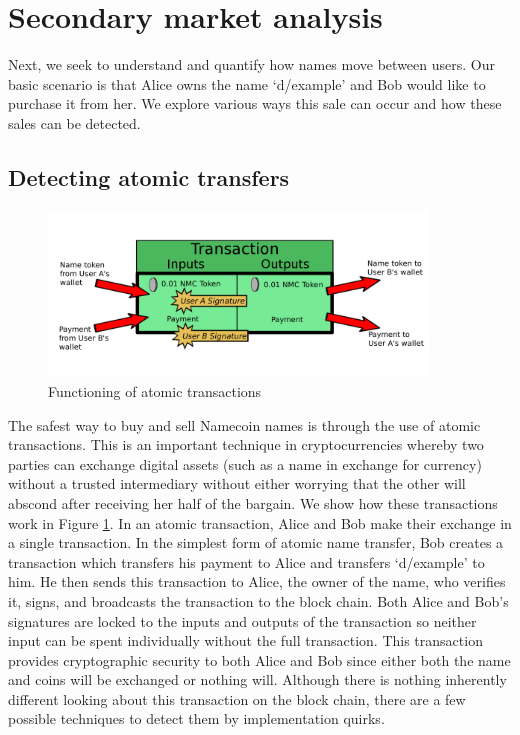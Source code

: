 \section{Secondary market analysis}
\label{sec:methods}
Next, we seek to understand and quantify how names move between users. Our basic scenario is that Alice owns the name `d/example' and Bob would like to purchase it from her. We explore various ways this sale can occur and how these sales can be detected.

\subsection{Detecting atomic transfers}

\begin{figure}
  \centering
  \includegraphics[width=0.9\textwidth]{figures/atomicTX}
  \caption{Functioning of atomic transactions}
  \label{fig:atomic}
\end{figure}

The safest way to buy and sell Namecoin names is through the use of atomic transactions. This is an important technique in cryptocurrencies whereby two parties can exchange digital assets (such as a name in exchange for currency) without a trusted intermediary without either worrying that the other will abscond after receiving her half of the bargain. We show how these transactions work in Figure \ref{fig:atomic}. In an atomic transaction, Alice and Bob make their exchange in a single transaction. In the simplest form of atomic name transfer, Bob creates a transaction which transfers his payment to Alice and transfers `d/example' to him. He then sends this transaction to Alice, the owner of the name, who verifies it, signs, and broadcasts the transaction to the block chain. Both Alice and Bob's signatures are locked to the inputs and outputs of the transaction so neither input can be spent individually without the full transaction. This transaction provides cryptographic security to both Alice and Bob since either both the name and coins will be exchanged or nothing will. Although there is nothing inherently different looking about this transaction on the block chain, there are a few possible techniques to detect them by implementation quirks.


